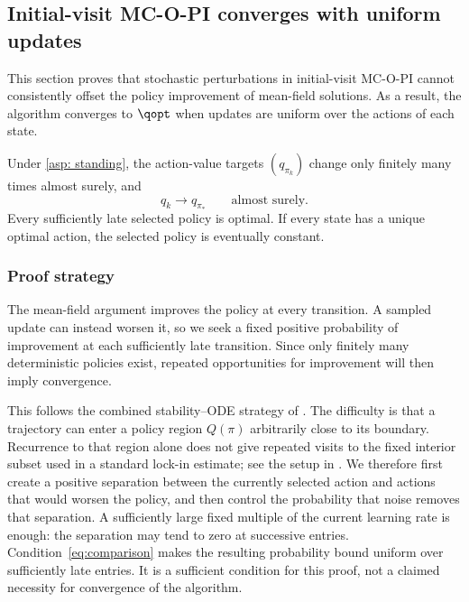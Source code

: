 \subsection{Initial-visit MC-O-PI converges with uniform updates}
This section proves that stochastic perturbations in initial-visit MC-O-PI cannot consistently offset the policy improvement of mean-field solutions. As a result, the algorithm converges to $\qopt$ when updates are uniform over the actions of each state.

\begin{theorem}
\label{thm: convergence mcopi uniform}
Under \autoref{asp: standing}, the action-value targets $(q_{\pi_k})$ change only finitely many times almost surely, and
\[
q_k\longrightarrow q_{\pi_*}\qquad\text{almost surely}.
\]
Every sufficiently late selected policy is optimal. If every state has a unique optimal action, the selected policy is eventually constant.
\end{theorem}

\subsubsection{Proof strategy}
\label{sec: limitations of existing methods}
The mean-field argument improves the policy at every transition. A sampled update can instead worsen it, so we seek a fixed positive probability of improvement at each sufficiently late transition. Since only finitely many deterministic policies exist, repeated opportunities for improvement will then imply convergence.

This follows the combined stability--ODE strategy of \citet[Section~5.4]{Kushner2003StochasticApplications}. The difficulty is that a trajectory can enter a policy region $Q(\pi)$ arbitrarily close to its boundary. Recurrence to that region alone does not give repeated visits to the fixed interior subset used in a standard lock-in estimate; see the setup in \citet[Section~3]{Borkar2002OnApproximation}.
We therefore first create a positive separation between the currently selected action and actions that would worsen the policy, and then control the probability that noise removes that separation. A sufficiently large fixed multiple of the current learning rate is enough: the separation may tend to zero at successive entries. Condition~\eqref{eq:comparison} makes the resulting probability bound uniform over sufficiently late entries. It is a sufficient condition for this proof, not a claimed necessity for convergence of the algorithm.

